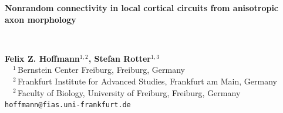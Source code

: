 \documentclass[a0,portrait]{a0poster}
\begin{document}

\vspace{-7cm}

\begin{minipage}[b]{0.9\linewidth}
  \veryHuge \textbf{Nonrandom connectivity in local cortical circuits from anisotropic axon morphology} \color{Black}
\end{minipage}\\
%
\begin{minipage}[b]{0.5\linewidth}
  \vspace{2cm}    
  \huge \textbf{Felix Z. Hoffmann$^{1,2}$, Stefan Rotter$^{1,3}$}\\[0.9cm] %
\large $\quad ^1\,$Bernstein Center Freiburg, Freiburg, Germany\\[0.2cm] %
$\quad ^2\,$Frankfurt Institute for Advanced Studies, Frankfurt am Main, Germany\\[0.2cm]
$\quad ^2\,$Faculty of Biology, University of Freiburg, Freiburg, Germany\\[-0.5cm]

\Large \texttt{hoffmann@fias.uni-frankfurt.de}\\
\end{minipage}
\end{document}
